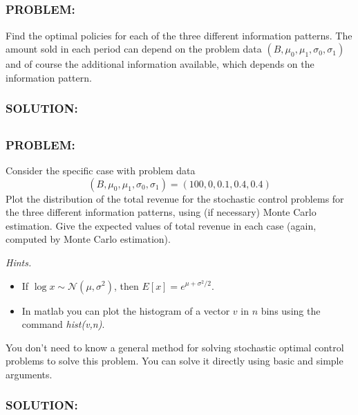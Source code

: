\documentclass[]{article}
\newcommand{\Problem}{\subsubsection*{\textbf{PROBLEM:}}}
\newcommand{\Solution}{\subsubsection*{\textbf{SOLUTION:}}}
\begin{document}
\subsection{}
\Problem
Find the optimal policies for each of the three different information patterns.
The amount sold in each period can depend on the problem data $(B,\mu_0,\mu_1,\sigma_0,\sigma_1)$ and of course the additional information available, which depends on the information pattern.

\Solution



\subsection{}
\Problem
Consider the specific case with problem data \[
    (B,\mu_0,\mu_1,\sigma_0,\sigma_1) = (100,0,0.1,0.4,0.4)
\]
Plot the distribution of the total revenue for the stochastic control problems for the three different information patterns, using (if necessary) Monte Carlo estimation. 
Give the expected values of total revenue in each case (again, computed by Monte Carlo estimation).

\emph{Hints.}
\begin{itemize}
    \item If $\log x \sim \mathcal{N}(\mu,\sigma^2)$, then $E[x] = e^{\mu+\sigma^2/2}$.
    \item In matlab you can plot the histogram of a vector $v$ in $n$ bins using the command \emph{hist(v,n)}.
\end{itemize}
You don't need to know a general method for solving stochastic optimal control problems to solve this problem. You can solve it directly using basic and simple arguments.

\Solution






\newpage
\appendix


\end{document}
